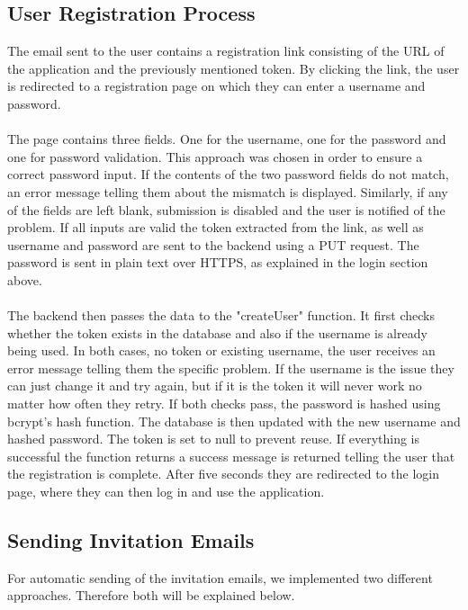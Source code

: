 \documentclass[a4paper,12pt]{report}
\begin{document}
\subsection{User Registration Process}
The email sent to the user contains a registration link consisting of the URL of the application and the previously mentioned token. By clicking the link, the user is redirected to a registration page on which they can enter a username and password.\\\\
The page contains three fields. One for the username, one for the password and one for password validation. This approach was chosen in order to ensure a correct password input. If the contents of the two password fields do not match, an error message telling them about the mismatch is displayed. Similarly, if any of the fields are left blank, submission is disabled and the user is notified of the problem. If all inputs are valid the token extracted from the link, as well as username and password are sent to the backend using a PUT request. The password is sent in plain text over HTTPS, as explained in the login section above.\\\\
The backend then passes the data to the "createUser" function. It first checks whether the token exists in the database and also if the username is already being used. In both cases, no token or existing username, the user receives an error message telling them the specific problem. If the username is the issue they can just change it and try again, but if it is the token it will never work no matter how often they retry. If both checks pass, the password is hashed using bcrypt's hash function. The database is then updated with the new username and hashed password. The token is set to null to prevent reuse. If everything is successful the function returns a success message is returned telling the user that the registration is complete. After five seconds they are redirected to the login page, where they can then log in and use the application.
\subsection{Sending Invitation Emails}
For automatic sending of the invitation emails, we implemented two different approaches. Therefore both will be explained below.
\end{document}
